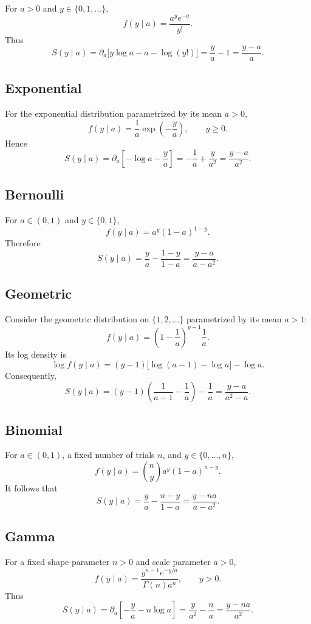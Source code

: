\documentclass[12pt]{article}
\begin{document}
For $a>0$ and $y\in\{0,1,\ldots\}$,
\[
    f(y\mid a)=\frac{a^y e^{-a}}{y!}.
\]
Thus
\[
    S(y\mid a)
    =\partial_a\bigl[y\log a-a-\log(y!)\bigr]
    =\frac{y}{a}-1
    =\frac{y-a}{a}.
\]

\subsection{Exponential}

For the exponential distribution parametrized by its mean $a>0$,
\[
    f(y\mid a)=\frac{1}{a}\exp\left(-\frac{y}{a}\right),
    \qquad y\geq0.
\]
Hence
\[
    S(y\mid a)
    =\partial_a\left[-\log a-\frac{y}{a}\right]
    =-\frac{1}{a}+\frac{y}{a^2}
    =\frac{y-a}{a^2}.
\]

\subsection{Bernoulli}

For $a\in(0,1)$ and $y\in\{0,1\}$,
\[
    f(y\mid a)=a^y(1-a)^{1-y}.
\]
Therefore
\[
    S(y\mid a)
    =\frac{y}{a}-\frac{1-y}{1-a}
    =\frac{y-a}{a-a^2}.
\]

\subsection{Geometric}

Consider the geometric distribution on $\{1,2,\ldots\}$ parametrized by its
mean $a>1$:
\[
    f(y\mid a)
    =\left(1-\frac{1}{a}\right)^{y-1}\frac{1}{a}.
\]
Its log density is
\[
    \log f(y\mid a)
    =(y-1)\bigl[\log(a-1)-\log a\bigr]-\log a.
\]
Consequently,
\[
    S(y\mid a)
    =(y-1)\left(\frac{1}{a-1}-\frac{1}{a}\right)-\frac{1}{a}
    =\frac{y-a}{a^2-a}.
\]

\subsection{Binomial}

For $a\in(0,1)$, a fixed number of trials $n$, and
$y\in\{0,\ldots,n\}$,
\[
    f(y\mid a)=\binom{n}{y}a^y(1-a)^{n-y}.
\]
It follows that
\[
    S(y\mid a)
    =\frac{y}{a}-\frac{n-y}{1-a}
    =\frac{y-na}{a-a^2}.
\]

\subsection{Gamma}

For a fixed shape parameter $n>0$ and scale parameter $a>0$,
\[
    f(y\mid a)
    =\frac{y^{n-1}e^{-y/a}}{\Gamma(n)a^n},
    \qquad y>0.
\]
Thus
\[
    S(y\mid a)
    =\partial_a\left[-\frac{y}{a}-n\log a\right]
    =\frac{y}{a^2}-\frac{n}{a}
    =\frac{y-na}{a^2}.
\]
\end{document}
